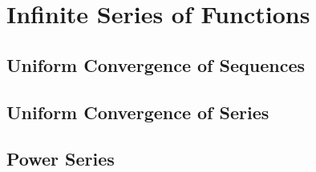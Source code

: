 \setcounter{chapter}{6}
\chapter{Infinite Series of Functions}
\thispagestyle{empty}
\newpage

\section{Uniform Convergence of Sequences}

\setcounter{Exercise}{1}


\vspace{12pt}



\vspace{12pt}

\setcounter{Exercise}{5}


\vspace{12pt}

\setcounter{Exercise}{7}


\vspace{12pt}

\setcounter{Exercise}{9}


\vspace{12pt}




\section{Uniform Convergence of Series}



\vspace{12pt}

\setcounter{Exercise}{3}


\vspace{12pt}

\setcounter{Exercise}{6}


\vspace{12pt}

\setcounter{Exercise}{9}



\section{Power Series}

